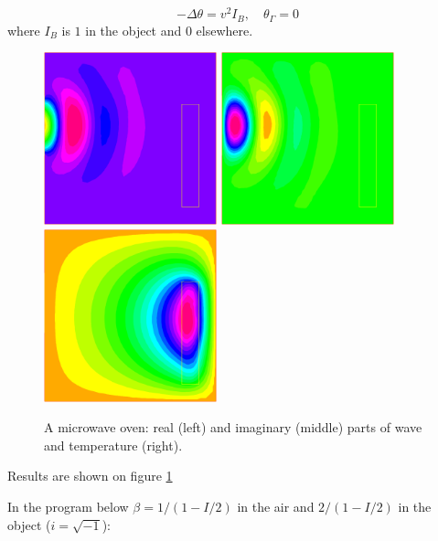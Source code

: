 \documentclass[a4paper,twoside,12pt]{book}
\begin{document}
$$-\Delta\theta = v^2 I_B, \quad \theta_\Gamma = 0
$$
where $I_B$ is $1$ in the object and $0$ elsewhere.
\begin{figure}[htbp]
\begin{center}
\includegraphics[width=5cm]{rmuonde}
\includegraphics[width=5cm]{imuonde}
\includegraphics[width=5cm]{tempmuonde}
\caption{\label{figmuonde}A microwave oven: real (left) and imaginary (middle) parts
 of wave  and temperature (right).}
\end{center}
\end{figure}

Results are shown on figure \ref{figmuonde}

In the program below $\beta = 1/(1-I/2)$ in the air and $2/(1-I/2)$
in the object ($i=\sqrt{-1}$):
\end{document}
